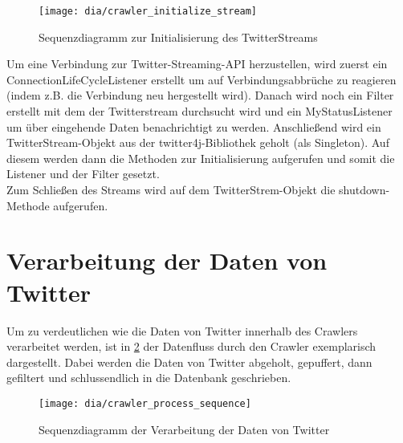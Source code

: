 \begin{figure}[h!]
	\centering
	\texttt{[image: dia/crawler\_initialize\_stream]}
	\caption{Sequenzdiagramm zur Initialisierung des TwitterStreams}
	\label{fig:initialize_stream}
\end{figure}

Um eine Verbindung zur Twitter-Streaming-API herzustellen, wird zuerst ein ConnectionLifeCycleListener erstellt um auf Verbindungsabbrüche zu reagieren (indem z.B. die Verbindung neu hergestellt wird). Danach wird noch ein Filter erstellt mit dem der Twitterstream durchsucht wird und ein MyStatusListener um über eingehende Daten benachrichtigt zu werden.
Anschließend wird ein TwitterStream-Objekt aus der twitter4j-Bibliothek geholt (als Singleton). Auf diesem werden dann die Methoden zur Initialisierung aufgerufen und somit die Listener und der Filter gesetzt.\\
Zum Schließen des Streams wird auf dem TwitterStrem-Objekt die shutdown-Methode aufgerufen.

\section{Verarbeitung der Daten von Twitter}
Um zu verdeutlichen wie die Daten von Twitter innerhalb des Crawlers verarbeitet werden, ist in \cref{fig:crawler_process} der Datenfluss durch den Crawler exemplarisch dargestellt. Dabei werden die Daten von Twitter abgeholt, gepuffert, dann gefiltert und schlussendlich in die Datenbank geschrieben.

\begin{figure}[h!]
	\centering
	\texttt{[image: dia/crawler\_process\_sequence]}
	\caption{Sequenzdiagramm der Verarbeitung der Daten von Twitter}
	\label{fig:crawler_process}
\end{figure}


